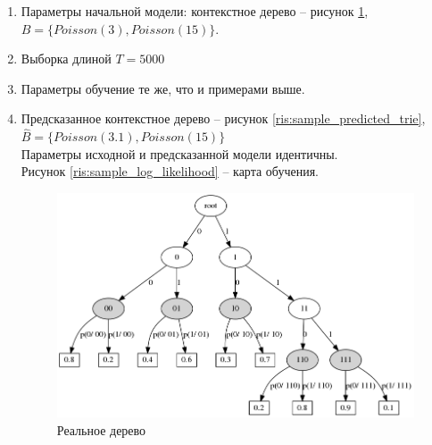 \documentclass{matmex-diploma-custom}
\begin{document}
\begin{itemize}
\begin{enumerate}
\item Параметры начальной модели: контекстное дерево -- рисунок \ref{ris:sample_real_trie}, \\$B = \{Poisson(3), Poisson(15)\}$. 
\item Выборка длиной $ T = 5000 $
\item Параметры обучение те же, что и примерами выше.      
\item Предсказанное контекстное дерево -- рисунок \ref{ris:sample_predicted_trie}, 
$\hat{B} = \{Poisson(3.1), Poisson(15)\}$
\\Параметры исходной и предсказанной модели идентичны.
\\
Рисунок \ref{ris:sample_log_likelihood} -- карта обучения.
\begin{figure}[h!]\centering
\begin{minipage}[b]{0.49 \textwidth}
	\includegraphics[scale=0.3]{img/sample/real_trie_.png}
	\centering
	\caption{ Реальное дерево }
	\label{ris:sample_real_trie}
	

\end{minipage}
\end{figure}
\end{enumerate}
\end{itemize}
\end{document}
